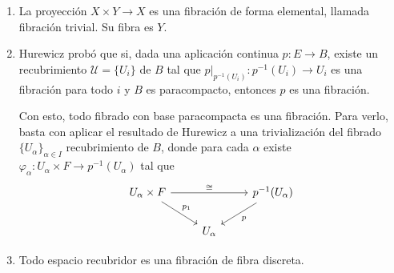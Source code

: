 \begin{demo}
\begin{ejems}
\begin{enumerate}
\item La proyección $X \times Y \longrightarrow X$ es una fibración de forma elemental, llamada fibración trivial. Su fibra es $Y$.
\item Hurewicz probó que si, dada una aplicación continua $p: E \longrightarrow B$, existe un recubrimiento $\mathcal{U} = \{U_i\}$ de $B$ tal que $p \vert_{p^{-1}(U_i)} : p^{-1}(U_i) \longrightarrow U_i$ es una fibración para todo $i$ y $B$ es paracompacto, entonces $p$ es una fibración. \par
Con esto, todo fibrado con base paracompacta es una fibración. Para verlo, basta con aplicar el resultado de Hurewicz a una trivialización del fibrado $\{ U_\alpha \}_{\alpha \in I}$ recubrimiento de $B$, donde para cada $\alpha$ existe $\varphi_\alpha : U_\alpha \times F \longrightarrow p^{-1}(U_\alpha)$ tal que
\[
\begin{tikzcd}
U_\alpha \times F \arrow{rr}{\cong} \arrow{dr}{p_1} & & p^{-1}(U_\alpha) \arrow{ld}{p} \\
& U_\alpha &
\end{tikzcd}
\]

\item Todo espacio recubridor es una fibración de fibra discreta.
\end{enumerate}
\end{ejems}
\end{demo}


